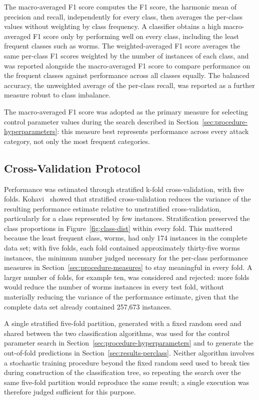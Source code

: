 \documentclass[10pt,conference]{IEEEtran}
\begin{document}
The macro-averaged F1 score computes the F1 score, the harmonic mean of precision and recall, independently for every class, then averages the per-class values without weighting by class frequency. A classifier obtains a high macro-averaged F1 score only by performing well on every class, including the least frequent classes such as worms. The weighted-averaged F1 score averages the same per-class F1 scores weighted by the number of instances of each class, and was reported alongside the macro-averaged F1 score to compare performance on the frequent classes against performance across all classes equally. The balanced accuracy, the unweighted average of the per-class recall, was reported as a further measure robust to class imbalance.

The macro-averaged F1 score was adopted as the primary measure for selecting control parameter values during the search described in Section~\ref{sec:procedure-hyperparameters}: this measure best represents performance across every attack category, not only the most frequent categories.

\subsection{Cross-Validation Protocol}
\label{sec:procedure-cv}

Performance was estimated through stratified k-fold cross-validation, with five folds. Kohavi~\cite{kohavi1995} showed that stratified cross-validation reduces the variance of the resulting performance estimate relative to unstratified cross-validation, particularly for a class represented by few instances. Stratification preserved the class proportions in Figure~\ref{fig:class-dist} within every fold. This mattered because the least frequent class, worms, had only 174 instances in the complete data set; with five folds, each fold contained approximately thirty-five worms instances, the minimum number judged necessary for the per-class performance measures in Section~\ref{sec:procedure-measures} to stay meaningful in every fold. A larger number of folds, for example ten, was considered and rejected: more folds would reduce the number of worms instances in every test fold, without materially reducing the variance of the performance estimate, given that the complete data set already contained 257,673 instances.

A single stratified five-fold partition, generated with a fixed random seed and shared between the two classification algorithms, was used for the control parameter search in Section~\ref{sec:procedure-hyperparameters} and to generate the out-of-fold predictions in Section~\ref{sec:results-perclass}. Neither algorithm involves a stochastic training procedure beyond the fixed random seed used to break ties during construction of the classification tree, so repeating the search over the same five-fold partition would reproduce the same result; a single execution was therefore judged sufficient for this purpose.
\end{document}
